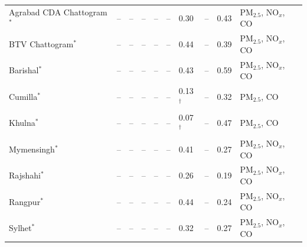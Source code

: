 \begin{longtable}{L{2.9cm} C{1.4cm} C{1.0cm} C{1.0cm} C{0.9cm} C{1.2cm} C{1.1cm} C{1.2cm} C{1.1cm} L{2.2cm}}
Agrabad CDA Chattogram$^{*}$ & -- & -- & -- & -- & -- & 0.30 & -- & 0.43 & PM$_{2.5}$, NO$_x$, CO \\
BTV Chattogram$^{*}$ & -- & -- & -- & -- & -- & 0.44 & -- & 0.39 & PM$_{2.5}$, NO$_x$, CO \\
Barishal$^{*}$ & -- & -- & -- & -- & -- & 0.43 & -- & 0.59 & PM$_{2.5}$, NO$_x$, CO \\
Cumilla$^{*}$ & -- & -- & -- & -- & -- & 0.13$^{\dagger}$ & -- & 0.32 & PM$_{2.5}$, CO \\
Khulna$^{*}$ & -- & -- & -- & -- & -- & 0.07$^{\dagger}$ & -- & 0.47 & PM$_{2.5}$, CO \\
Mymensingh$^{*}$ & -- & -- & -- & -- & -- & 0.41 & -- & 0.27 & PM$_{2.5}$, NO$_x$, CO \\
Rajshahi$^{*}$ & -- & -- & -- & -- & -- & 0.26 & -- & 0.19 & PM$_{2.5}$, NO$_x$, CO \\
Rangpur$^{*}$ & -- & -- & -- & -- & -- & 0.44 & -- & 0.24 & PM$_{2.5}$, NO$_x$, CO \\
Sylhet$^{*}$ & -- & -- & -- & -- & -- & 0.32 & -- & 0.27 & PM$_{2.5}$, NO$_x$, CO \\
\end{longtable}
\endgroup
